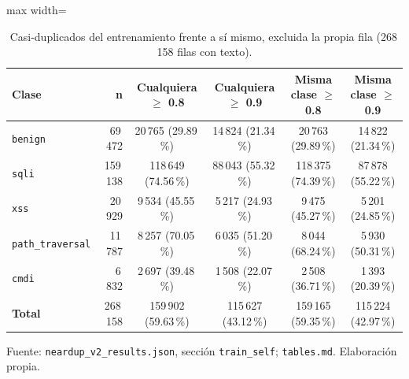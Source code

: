 \begin{table}[htbp]
\centering
\footnotesize
\setlength{\tabcolsep}{3pt}
\begin{adjustbox}{max width=\linewidth}
\begin{tabular}{|l|r|c|c|c|c|}
\hline
\textbf{Clase} & \textbf{n} & \textbf{Cualquiera $\geq$ 0.8} & \textbf{Cualquiera $\geq$ 0.9} & \textbf{Misma clase $\geq$ 0.8} & \textbf{Misma clase $\geq$ 0.9} \\ \hline
\texttt{benign} & 69\,472 & 20\,765 (29.89\,\%) & 14\,824 (21.34\,\%) & 20\,763 (29.89\,\%) & 14\,822 (21.34\,\%) \\ \hline
\texttt{sqli} & 159\,138 & 118\,649 (74.56\,\%) & 88\,043 (55.32\,\%) & 118\,375 (74.39\,\%) & 87\,878 (55.22\,\%) \\ \hline
\texttt{xss} & 20\,929 & 9\,534 (45.55\,\%) & 5\,217 (24.93\,\%) & 9\,475 (45.27\,\%) & 5\,201 (24.85\,\%) \\ \hline
\texttt{path\_traversal} & 11\,787 & 8\,257 (70.05\,\%) & 6\,035 (51.20\,\%) & 8\,044 (68.24\,\%) & 5\,930 (50.31\,\%) \\ \hline
\texttt{cmdi} & 6\,832 & 2\,697 (39.48\,\%) & 1\,508 (22.07\,\%) & 2\,508 (36.71\,\%) & 1\,393 (20.39\,\%) \\ \hline
\textbf{Total} & 268\,158 & 159\,902 (59.63\,\%) & 115\,627 (43.12\,\%) & 159\,165 (59.35\,\%) & 115\,224 (42.97\,\%) \\ \hline
\end{tabular}
\end{adjustbox}
\caption{Casi-duplicados del entrenamiento frente a sí mismo, excluida la propia fila (268\,158 filas con texto).}
\label{tabla:anexo-casi-train}
\par\smallskip\footnotesize Fuente: \texttt{neardup\_v2\_results.json}, sección \texttt{train\_self}; \texttt{tables.md}. Elaboración propia.
\end{table}


